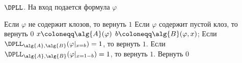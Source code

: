 \begin{algorithm}[H]
    \label{alg:dpll-classic}
    \caption{$\DPLL$. На вход подается формула $\varphi$}
    \begin{algorithmic}[1]
        \State Если $\varphi$ не содержит клозов, то вернуть $1$
        \State Если $\varphi$ содержит пустой клоз, то вернуть $0$
        \State $x \coloneqq \alg{A}(\varphi)$
        \State $b \coloneqq \alg{B}(\varphi, x)$;
        \State Если $\DPLL_{\alg{A}, \alg{B}}(\varphi|_{x = b}) = 1$, то вернуть $1$.
        \State Если $\DPLL_{\alg{A}, \alg{B}}(\varphi|_{x = 1 - b}) = 1$, то вернуть $1$.
        \State Вернуть $0$
    \end{algorithmic}
\end{algorithm}